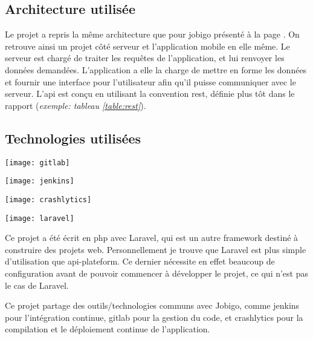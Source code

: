 \documentclass[rapport.tex]{subfiles}
\begin{document}
        \subsection{Architecture utilisée}
        Le projet a repris la même architecture que pour jobigo présenté à la
        page \pageref{subsec:jobigo}. On retrouve ainsi un projet côté serveur
        et l'application mobile en elle même. Le serveur est chargé de traiter
        les requêtes de l'application, et lui renvoyer les données demandées.
        L'application a elle la charge de mettre en forme les données et
        fournir une interface pour l'utilisateur afin qu'il puisse communiquer
        avec le serveur. L'\gls{api} est conçu en utilisant la convention \gls{rest}, 
        définie plus tôt dans le rapport (\emph{exemple: tableau \ref{table:rest}}).

        \subsection{Technologies utilisées}
        \begin{center}
            \begin{minipage}{0.20\textwidth}
                \texttt{[image: gitlab]}
            \end{minipage}
            \begin{minipage}{0.20\textwidth}
                \texttt{[image: jenkins]}
            \end{minipage}
            \begin{minipage}{0.20\textwidth}
                \texttt{[image: crashlytics]}
            \end{minipage}
            \begin{minipage}{0.10\textwidth}
                \texttt{[image: laravel]}
            \end{minipage}
        \end{center}

        Ce projet a été écrit en php avec Laravel\cite{laravel}, qui est un autre \gls{framework} destiné à construire des projets web. Personnellement
        je trouve que Laravel est plus simple d'utilisation que api-plateform. Ce dernier nécessite en effet beaucoup de configuration
        avant de pouvoir commencer à développer le projet, ce qui n'est pas le cas de Laravel.

        Ce projet partage des outils/technologies communs avec Jobigo, comme jenkins pour l'intégration continue, gitlab pour la gestion du code, et crashlytics pour la compilation et le déploiement continue de l'application.
\end{document}
